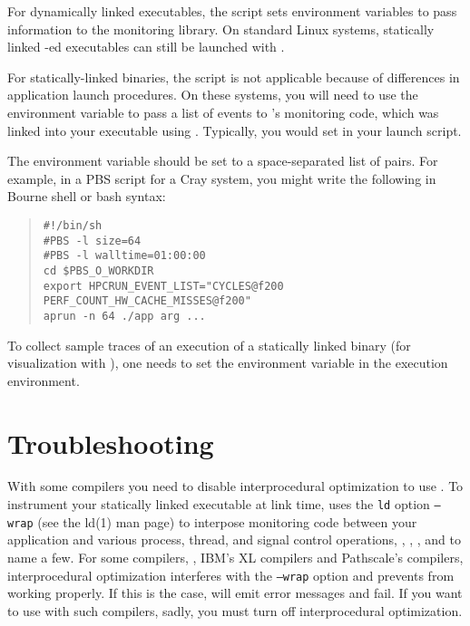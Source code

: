 \documentclass[11pt,letterpaper]{report}
\begin{document}
For dynamically linked executables, the \hpcrun{} script sets environment variables to pass information to the \HPCToolkit{} monitoring library.
On standard Linux systems, statically linked \hpclink{}-ed executables can still be launched with \hpcrun{}.

For statically-linked binaries, the \hpcrun{} script is not applicable because of differences in application launch procedures.
On these systems, you will need to use the  environment variable to pass a list of events to \HPCToolkit{}'s monitoring code, which was linked into your executable using \hpclink{}.
Typically, you would set  in your launch script.

The  environment variable should be set to a space-separated list of  pairs.
For example, in a PBS script for a Cray system, you might write the following in Bourne shell or bash syntax:
\begin{quote}
\begin{verbatim}
#!/bin/sh
#PBS -l size=64
#PBS -l walltime=01:00:00
cd $PBS_O_WORKDIR
export HPCRUN_EVENT_LIST="CYCLES@f200 PERF_COUNT_HW_CACHE_MISSES@f200"
aprun -n 64 ./app arg ...
\end{verbatim}
\end{quote}

To collect sample traces of  an execution of a statically linked binary (for visualization with \hpctraceviewer{}), one needs to set the environment variable  in the execution environment.



\section{Troubleshooting}

With some compilers you need to disable interprocedural optimization to use \hpclink{}.
To instrument your statically linked executable at link time, \hpclink{} uses the \texttt{ld} option \texttt{--wrap} (see the ld(1) man page) to interpose monitoring code between your application and various process, thread, and signal control operations, \eg{}, , , and  to name a few.
For some compilers, \eg{}, IBM's XL compilers and Pathscale's compilers, interprocedural optimization interferes with the \texttt{--wrap} option and prevents \hpclink{} from working properly.
If this is the case, \hpclink{} will emit error messages and fail.
If you want to use \hpclink{} with such compilers, sadly, you must turn off interprocedural optimization.
\end{document}
